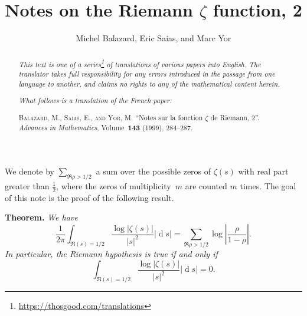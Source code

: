 \documentclass{article}
\title{Notes on the Riemann $\zeta$ function, 2}
\author{Michel Balazard, Eric Saias, and Marc Yor}
\date{}
\newcommand{\doctype}{French paper}
\newcommand{\origcit}{%
  \textsc{Balazard, M., Saias, E., and Yor, M.}
  ``Notes sur la fonction $\zeta$ de Riemann, 2''.
  \emph{Advances in Mathematics}, Volume~\textbf{143} (1999), 284--287.%
}
\newenvironment{itenv}[1]
  {\phantomsection\par\medskip\noindent\textbf{#1.}\itshape}
  {\par\medskip}
\newcommand{\dd}{\operatorname{d}\!}
\newcommand{\oldpage}[1]{\marginpar{\footnotesize$\Big\vert$ \textit{p.~#1}}}
\begin{document}
\maketitle
\thispagestyle{fancy}

\renewcommand{\abstractname}{Translator's note.}

\begin{abstract}
  \renewcommand*{\thefootnote}{\fnsymbol{footnote}}
  \emph{This text is one of a series\footnote{\url{https://thosgood.com/translations}} of translations of various papers into English.}
  \emph{The translator takes full responsibility for any errors introduced in the passage from one language to another, and claims no rights to any of the mathematical content herein.}

  \medskip
  
  \emph{What follows is a translation of the \doctype:}

  \medskip\noindent
  \origcit
\end{abstract}

\setcounter{footnote}{0}

\bigskip



\bigskip

\oldpage{284}
We denote by $\sum_{\Re\rho>1/2}$ a sum over the possible zeros of $\zeta(s)$ with real part greater than $\frac12$, where the zeros of multiplicity~$m$ are counted $m$ times.
The goal of this note is the proof of the following result.

\begin{itenv}{Theorem}
  We have
  \[
  \label{1}
    \frac{1}{2\pi}\int_{\Re(s)=1/2} \frac{\log|\zeta(s)|}{|s|^2}|\dd s|
    = \sum_{\Re\rho>1/2} \log\left|\frac{\rho}{1-\rho}\right|.
  \tag{1}
  \]
  In particular, the Riemann hypothesis is true if and only if
  \[
    \int_{\Re(s)=1/2} \frac{\log|\zeta(s)|}{|s|^2}|\dd s| = 0.
  \]
\end{itenv}
\end{document}
